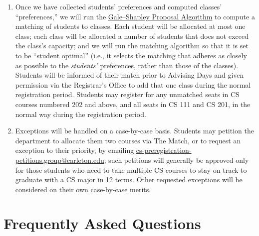 \documentclass{article}
\begin{document}
\begin{enumerate}
\item Once we have collected students' preferences and computed classes' ``preferences,'' we will run the \href{https://www.jstor.org/stable/2312726}{Gale--Shapley Proposal Algorithm} to compute a matching of students to classes.  Each student will be allocated at most one class; each class will be allocated a number of students that does not exceed the class's capacity; and we will run the matching algorithm so that it is set to be ``student optimal'' (i.e., it selects the matching that adheres as closely as possible to the \emph{students'} preferences, rather than those of the classes).  Students will be informed of their match prior to Advising Days and given permission via the Registrar's Office to add that one class during the normal registration period.  Students may register for any unmatched seats in CS courses numbered 202 and above, and all seats in CS 111 and CS 201, in the normal way during the registration period.
  
\item Exceptions will be handled on a case-by-case basis.  Students may petition the department to allocate them two courses via The Match, or to request an exception to their priority, by emailing \href{mailto:cs-preregistration-petitions.group@carleton.edu}{cs-preregistration-petitions.group@carleton.edu}; such petitions will generally be approved only for those students who need to take multiple CS courses to stay on track to graduate with a CS major in 12 terms.  Other requested exceptions will be considered on their own case-by-case merits.

\end{enumerate}

  
\newpage\enlargethispage{2\baselineskip}

\section*{Frequently Asked Questions}

\def\qitem{\normalsize \stepcounter{enumi}\item[Question \#\arabic{enumi}.]}
\def\aitem{\vspace*{-\itemsep}\small\item[\it Answer.]}
\setcounter{enumi}{0}
\end{document}
